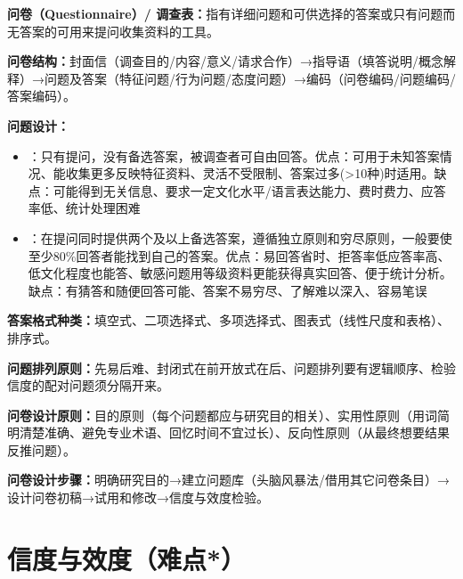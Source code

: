\begin{keybox}
\textbf{问卷（Questionnaire）/ 调查表：}指有详细问题和可供选择的答案或只有问题而无答案的可用来提问收集资料的工具。

\textbf{问卷结构：}封面信（调查目的/内容/意义/请求合作）→指导语（填答说明/概念解释）→问题及答案（特征问题/行为问题/态度问题）→编码（问卷编码/问题编码/答案编码）。

\textbf{问题设计：}
\begin{itemize}[leftmargin=*]
    \item {}：只有提问，没有备选答案，被调查者可自由回答。优点：可用于未知答案情况、能收集更多反映特征资料、灵活不受限制、答案过多(>10种)时适用。缺点：可能得到无关信息、要求一定文化水平/语言表达能力、费时费力、应答率低、统计处理困难
    \item {}：在提问同时提供两个及以上备选答案，遵循独立原则和穷尽原则，一般要使至少80\%回答者能找到自己的答案。优点：易回答省时、拒答率低应答率高、低文化程度也能答、敏感问题用等级资料更能获得真实回答、便于统计分析。缺点：有猜答和随便回答可能、答案不易穷尽、了解难以深入、容易笔误
\end{itemize}

\textbf{答案格式种类：}填空式、二项选择式、多项选择式、图表式（线性尺度和表格）、排序式。

\textbf{问题排列原则：}先易后难、封闭式在前开放式在后、问题排列要有逻辑顺序、检验信度的配对问题须分隔开来。

\textbf{问卷设计原则：}目的原则（每个问题都应与研究目的相关）、实用性原则（用词简明清楚准确、避免专业术语、回忆时间不宜过长）、反向性原则（从最终想要结果反推问题）。

\textbf{问卷设计步骤：}明确研究目的→建立问题库（头脑风暴法/借用其它问卷条目）→设计问卷初稿→试用和修改→信度与效度检验。
\end{keybox}

\section{信度与效度（难点*）}

